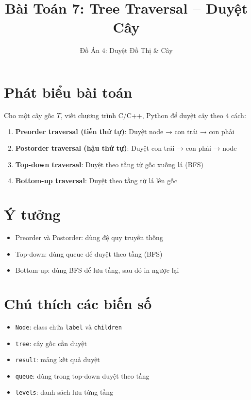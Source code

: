 \documentclass[12pt]{article}
\title{Bài Toán 7: Tree Traversal – Duyệt Cây}
\author{Đồ Án 4: Duyệt Đồ Thị \& Cây}
\date{}
\begin{document}
\maketitle

\section*{Phát biểu bài toán}
Cho một cây gốc $T$, viết chương trình C/C++, Python để duyệt cây theo 4 cách:
\begin{enumerate}[label=(\alph*)]
    \item \textbf{Preorder traversal (tiền thứ tự)}: Duyệt node → con trái → con phải
    \item \textbf{Postorder traversal (hậu thứ tự)}: Duyệt con trái → con phải → node
    \item \textbf{Top-down traversal}: Duyệt theo tầng từ gốc xuống lá (BFS)
    \item \textbf{Bottom-up traversal}: Duyệt theo tầng từ lá lên gốc
\end{enumerate}

\section*{Ý tưởng}
\begin{itemize}
    \item Preorder và Postorder: dùng đệ quy truyền thống
    \item Top-down: dùng queue để duyệt theo tầng (BFS)
    \item Bottom-up: dùng BFS để lưu tầng, sau đó in ngược lại
\end{itemize}

\section*{Chú thích các biến số}
\begin{itemize}
    \item \texttt{Node}: class chứa \texttt{label} và \texttt{children}
    \item \texttt{tree}: cây gốc cần duyệt
    \item \texttt{result}: mảng kết quả duyệt
    \item \texttt{queue}: dùng trong top-down duyệt theo tầng
    \item \texttt{levels}: danh sách lưu từng tầng
\end{itemize}
\end{document}
